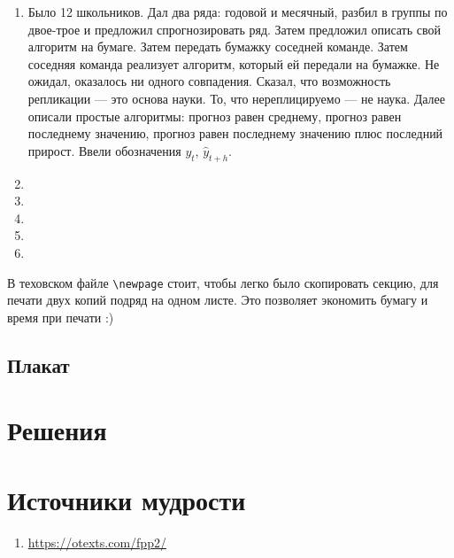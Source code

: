 \documentclass[12pt]{article}
\newcounter{problem}[section]
\theoremstyle{definition}
\begin{document}
\begin{enumerate}
  \item Было 12 школьников. Дал два ряда: годовой и месячный, разбил в группы по двое-трое и предложил спрогнозировать ряд. 
  Затем предложил описать свой алгоритм на бумаге. Затем передать бумажку соседней команде. Затем соседняя команда реализует 
  алгоритм, который ей передали на бумажке. Не ожидал, оказалось ни одного совпадения. Сказал, что возможность репликации — это основа науки.
  То, что нереплицируемо — не наука. Далее описали простые алгоритмы: прогноз равен среднему, прогноз равен последнему значению,
  прогноз равен последнему значению плюс последний прирост. Ввели обозначения $y_t$, $\hat y_{t+h}$.
  \item 
  \item 
  \item 
  \item 
  \item 
\end{enumerate}

В теховском файле \verb|\newpage| стоит, чтобы легко было скопировать секцию, для печати двух копий подряд на одном листе.
Это позволяет экономить бумагу и время при печати :)

\subsection{Плакат}






\renewenvironment{solution}[1]{%
         \vskip .5cm plus 2cm minus 0.1cm%
         {\bfseries \hyperlink{problem:#1}{#1.}}%
}%
{%
}%



\section{Решения}



\section{Источники мудрости}


\begin{enumerate}
\item \url{https://otexts.com/fpp2/}
\end{enumerate}

\printbibliography[heading=none]
\end{document}
